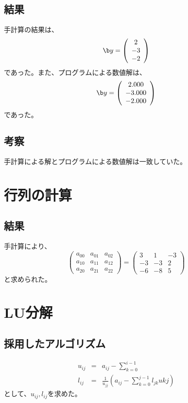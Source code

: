 \documentclass[11pt]{ltjsarticle}
\begin{document}
		\subsection{結果}
			手計算の結果は、
			\[
				{\b y} = \left(
					\begin{array}{c}
						2 \\
						-3 \\
						-2
					\end{array}
				\right)
			\]
			であった。また、プログラムによる数値解は、
			\[
				{\b y} = \left(
					\begin{array}{c}
						2.000 \\
						-3.000 \\
						-2.000
					\end{array}
				\right)
			\]
			であった。
		\subsection{考察}
			手計算による解とプログラムによる数値解は一致していた。

    \section{行列の計算}
		\subsection{結果}
			手計算により、
			\begin{equation}
				\left(
					\begin{array}{ccc}
						a_{00} & a_{01} & a_{02} \\
						a_{10} & a_{11} & a_{12} \\
						a_{20} & a_{21} & a_{22}
					\end{array}
				\right)
					=
				\left(
					\begin{array}{ccc}
						3 & 1 & -3 \\
						-3 & -3 & 2 \\
						-6 & -8 & 5
					\end{array}
				\right) \label{eq1}
			\end{equation}
			と求められた。

    \section{LU分解}
    	\subsection{採用したアルゴリズム}
			\begin{eqnarray*}
				u_{ij} &=& a_{ij} - \sum_{k=0}^{i-1} \\
				l_{ij} &=& \frac{1}{u_{jj}}\left( a_{ij} - \sum_{k=0}^{j-1} l_{jk}u{kj} \right)
			\end{eqnarray*}
			として、$u_{ij}, l_{ij}$を求めた。
			
\end{document}
